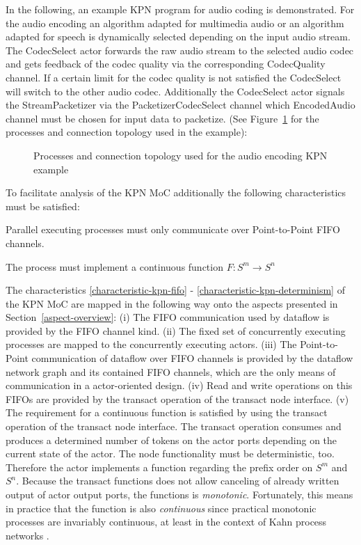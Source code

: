 In the following, an example KPN program for audio coding
is demonstrated. For the audio encoding an algorithm
adapted for multimedia audio or an algorithm adapted for speech
is dynamically selected depending on the input audio stream.
The CodecSelect actor forwards the raw audio stream to the
selected audio codec and gets feedback of the codec quality
via the corresponding CodecQuality channel. If a certain
limit for the codec quality is not satisfied the CodecSelect will
switch to the other audio codec. Additionally the CodecSelect actor
signals the StreamPacketizer via the PacketizerCodecSelect channel
which EncodedAudio channel must be chosen for input data to packetize.
(See Figure~\ref{fig:media-speech-audio-coding}
for the processes and connection topology used in the example):

\begin{figure}[h]
\centering

\caption{Processes and connection topology used for the audio encoding KPN example}
\label{fig:media-speech-audio-coding}
\end{figure}

To facilitate analysis of the KPN MoC additionally the following
characteristics must be satisfied:
\begin{characteristic}\label{characteristic-kpn-communication}
  Parallel executing processes must only communicate over Point-to-Point FIFO channels.
\end{characteristic}

\begin{characteristic}\label{characteristic-kpn-determinism}
  The process must implement a continuous function $F: S^m \to S^n$
\end{characteristic}

The characteristics \ref{characteristic-kpn-fifo} -
\ref{characteristic-kpn-determinism} of the KPN MoC are mapped in the following way
onto the aspects presented in Section~\ref{aspect-overview}:
(i) The FIFO communication
used by dataflow is provided by the FIFO channel kind.
(ii) The fixed set of concurrently executing processes
are mapped to the concurrently executing actors.
(iii) The Point-to-Point communication of dataflow over FIFO channels
is provided by the dataflow network graph
and its contained FIFO channels, which are the only means of communication in a
actor-oriented design.
(iv) Read and write operations on this FIFOs are provided by
the transact operation of the transact node interface.
(v) The requirement for a continuous function is satisfied by using the
transact operation of the transact node interface.
The transact operation consumes and produces
a determined number of tokens on the actor ports
depending on the current state of the actor.
The node functionality must be deterministic, too.
Therefore the actor implements a function regarding the
prefix order on $S^m$ and $S^n$. Because the
transact functions does not allow canceling of already
written output of actor output ports, the functions is
\emph{monotonic}. Fortunately, this means in practice
that the function is also \emph{continuous} since practical monotonic
processes are invariably continuous, at least in the context
of Kahn process networks \cite{LeeDenotialDF:1997}.

